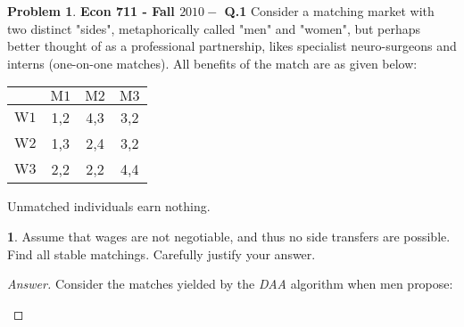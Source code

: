 \documentclass{article}
\theoremstyle{definition}
\newtheorem{problem}{Problem}
\newtheorem{subproblem}{}[problem]
\begin{document}
\begin{problem}
\textbf{Econ 711 - Fall $2010-$ Q.1} Consider a matching market with two distinct "sides", metaphorically called "men" and "women", but perhaps better thought of as a professional partnership, likes specialist neuro-surgeons and interns (one-on-one matches). All benefits of the match are as given below:
\begin{center}
\begin{tabular}{|c|c|c|c|}
\hline & $\mathrm{M} 1$ & $\mathrm{M} 2$ & $\mathrm{M} 3$ \\
\hline $\mathrm{W} 1$ & 1,2 & 4,3 & 3,2 \\
\hline $\mathrm{W} 2$ & 1,3 & 2,4 & 3,2 \\
\hline $\mathrm{W} 3$ & 2,2 & 2,2 & 4,4 \\
\hline
\end{tabular}
\end{center}
Unmatched individuals earn nothing.
\begin{subproblem}
Assume that wages are not negotiable, and thus no side transfers are possible. Find all stable matchings. Carefully justify your answer.
\end{subproblem}
\begin{proof}[Answer]
Consider the matches yielded by the \textit{DAA} algorithm when men propose:

\begin{center}
    



\begin{tikzpicture}[x=0.75pt,y=0.75pt,yscale=-1,xscale=1]


\end{tikzpicture}
\end{center}
\end{proof}
\end{problem}
\end{document}
